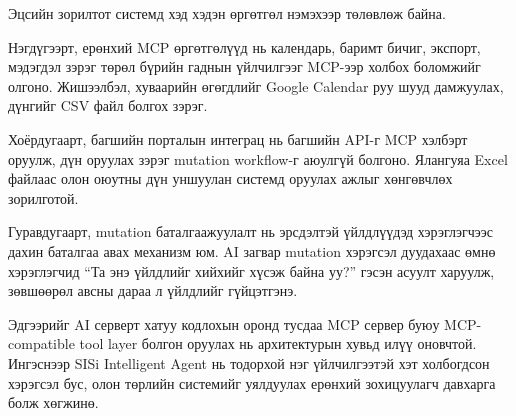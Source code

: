 Эцсийн зорилтот системд хэд хэдэн өргөтгөл нэмэхээр төлөвлөж байна.

Нэгдүгээрт, ерөнхий MCP өргөтгөлүүд нь календарь, баримт бичиг, экспорт, мэдэгдэл зэрэг төрөл бүрийн гаднын үйлчилгээг MCP-ээр холбох боломжийг олгоно. Жишээлбэл, хуваарийн өгөгдлийг Google Calendar руу шууд дамжуулах, дүнгийг CSV файл болгох зэрэг.

Хоёрдугаарт, багшийн порталын интеграц нь багшийн API-г MCP хэлбэрт оруулж, дүн оруулах зэрэг mutation workflow-г аюулгүй болгоно. Ялангуяа Excel файлаас олон оюутны дүн уншуулан системд оруулах ажлыг хөнгөвчлөх зорилготой.

Гуравдугаарт, mutation баталгаажуулалт нь эрсдэлтэй үйлдлүүдэд хэрэглэгчээс дахин баталгаа авах механизм юм. AI загвар mutation хэрэгсэл дуудахаас өмнө хэрэглэгчид ``Та энэ үйлдлийг хийхийг хүсэж байна уу?'' гэсэн асуулт харуулж, зөвшөөрөл авсны дараа л үйлдлийг гүйцэтгэнэ.

Эдгээрийг AI серверт хатуу кодлохын оронд тусдаа MCP сервер буюу MCP-compatible tool layer болгон оруулах нь архитектурын хувьд илүү оновчтой. Ингэснээр SISi Intelligent Agent нь тодорхой нэг үйлчилгээтэй хэт холбогдсон хэрэгсэл бус, олон төрлийн системийг уялдуулах ерөнхий зохицуулагч давхарга болж хөгжинө.
